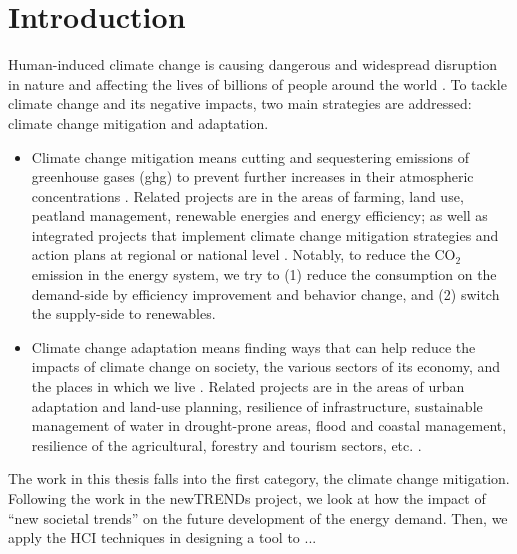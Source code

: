 \chapter{Introduction}

Human-induced climate change is causing dangerous and widespread disruption in nature and affecting the lives of billions of people around the world \cite{ipcc}. 
To tackle climate change and its negative impacts, two main strategies are addressed: climate change mitigation and adaptation.

\begin{itemize}
  \item Climate change mitigation means cutting and sequestering emissions of greenhouse gases (\gls{ghg}) to prevent further increases in their atmospheric concentrations \cite{handbook}.
Related projects are in the areas of farming, land use, peatland management, renewable energies and energy efficiency; as well as integrated projects that implement climate change mitigation strategies and action plans at regional or national level \cite{ec}.
Notably, to reduce the CO$_2$ emission in the energy system,
we try to (1) reduce the consumption on the demand-side by efficiency improvement and behavior change,
and (2) switch the supply-side to renewables.

  \item Climate change adaptation means finding ways that can help reduce the impacts of climate change on society, the various sectors of its economy, and the places in which we live \cite{handbook}.
Related projects are in the areas of urban adaptation and land-use planning, resilience of infrastructure, sustainable management of water in drought-prone areas, flood and coastal management, resilience of the agricultural, forestry and tourism sectors, etc. \cite{ec}.  
\end{itemize}

The work in this thesis falls into the first category, the climate change mitigation.
Following the work in the newTRENDs project, %
we look at how the impact of ``new societal trends'' on the future development of the energy demand.
Then, we apply the HCI techniques in designing a tool to ...  %

